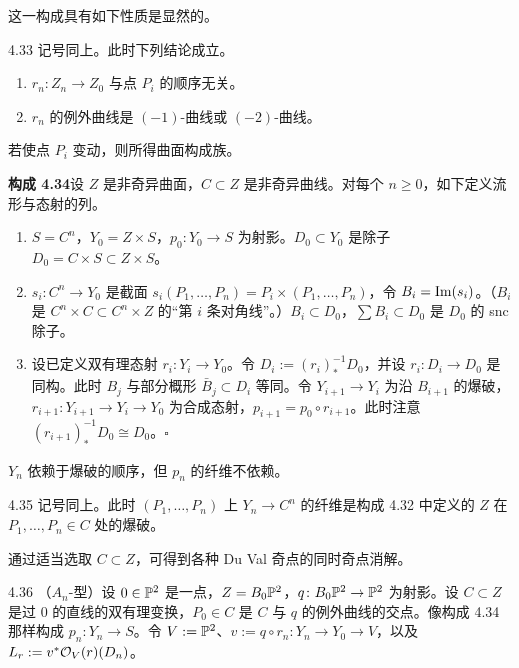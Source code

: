 这一构成具有如下性质是显然的。

\begin{lemma*}{4.33}
记号同上。此时下列结论成立。
\begin{enumerate}[label=(\arabic*),leftmargin=*]
\item $r_n\colon Z_n\to Z_0$ 与点 $P_i$ 的顺序无关。
\item $r_n$ 的例外曲线是 $(-1)$-曲线或 $(-2)$-曲线。
\end{enumerate}
\end{lemma*}

若使点 $P_i$ 变动，则所得曲面构成族。

\par\medskip\noindent\textbf{构成 4.34}\quad 设 $Z$ 是非奇异曲面，$C\subset Z$ 是非奇异曲线。对每个 $n\ge 0$，如下定义流形与态射的列。
\begin{enumerate}[label=(\arabic*),leftmargin=*]
\item $S=C^n$，$Y_0=Z\times S$，$p_0\colon Y_0\to S$ 为射影。$D_0\subset Y_0$ 是除子 $D_0=C\times S\subset Z\times S$。
\item $s_i\colon C^n\to Y_0$ 是截面 $s_i(P_1,\dots,P_n)=P_i\times(P_1,\dots,P_n)$，令 $B_i=\operatorname{Im}(s_i)$。（$B_i$ 是 $C^n\times C\subset C^n\times Z$ 的“第 $i$ 条对角线”。）$B_i\subset D_0$，$\sum B_i\subset D_0$ 是 $D_0$ 的 snc 除子。
\item 设已定义双有理态射 $r_i\colon Y_i\to Y_0$。令 $D_i:=(r_i)_*^{-1}D_0$，并设 $r_i\colon D_i\to D_0$ 是同构。此时 $B_j$ 与部分概形 $\bar B_j\subset D_i$ 等同。令 $Y_{i+1}\to Y_i$ 为沿 $B_{i+1}$ 的爆破，$r_{i+1}\colon Y_{i+1}\to Y_i\to Y_0$ 为合成态射，$p_{i+1}=p_0\circ r_{i+1}$。此时注意 $(r_{i+1})_*^{-1}D_0\cong D_0$。\hfill$\square$
\end{enumerate}

$Y_n$ 依赖于爆破的顺序，但 $p_n$ 的纤维不依赖。

\begin{lemma}{4.35}
记号同上。此时 $(P_1,\dots,P_n)$ 上 $Y_n\to C^n$ 的纤维是构成 4.32 中定义的 $Z$ 在 $P_1,\dots,P_n\in C$ 处的爆破。
\end{lemma}

通过适当选取 $C\subset Z$，可得到各种 Du Val 奇点的同时奇点消解。

\begin{example}{4.36}
（$A_n$-型）设 $0\in\mathbb{P}^2$ 是一点，$Z=B_0\mathbb{P}^2$，$q\colon B_0\mathbb{P}^2\to\mathbb{P}^2$ 为射影。设 $C\subset Z$ 是过 $0$ 的直线的双有理变换，$P_0\in C$ 是 $C$ 与 $q$ 的例外曲线的交点。像构成 4.34 那样构成 $p_n\colon Y_n\to S$。令 $V:=\mathbb{P}^2$、$v:=q\circ r_n\colon Y_n\to Y_0\to V$，以及 $L_r:=v^*\mathcal{O}_V(r)(D_n)$。
\end{example}

